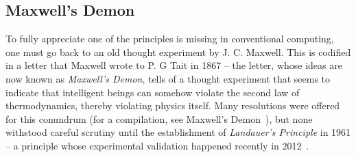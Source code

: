 \documentclass{article}
\begin{document}
\begin{comment}
\begin{quote}
  Ed Fredkin pursued the idea that information must be finite in
  density. One day, he announced that things must be even more simple
  than that. He said that he was going to assume that information
  itself is conserved. “You’re out of you mind, Ed.” I
  pronounced. “That’s completely ridiculous. Nothing could happen in
  such a world. There couldn’t even be logical gates. No decisions
  could ever be made.” But when Fredkin gets one of his ideas, he’s
  quite immune to objections like that; indeed, they fuel him with
  energy. Soon he went on to assume that information processing must
  also be reversible — and invented what’s now called the Fredkin
  gate. (Minsky 1999)

  In other terms, what is so good in logic that quantum physics should
  obey?  Can't we imagine that our conceptions about logic are wrong,
  so wrong that they are unable to cope with the quantum miracle?
  [\ldots] Instead of teaching logic to nature, it is more reasonable
  to learn from her. Instead of interpreting quantum into logic, we
  shall interpret logic into quantum (Girard 2007).
\end{quote}
\end{comment}

\subsection{Maxwell's Demon}

To fully appreciate one of the principles is missing in conventional
computing, one must go back to an old thought experiment by
J. C. Maxwell. This is codified in a letter that Maxwell wrote to P. G
Tait in 1867 -- the letter, whose ideas are now known as
\emph{Maxwell's Demon}, tells of a thought experiment that seems to
indicate that intelligent beings can somehow violate the second law of
thermodynamics, thereby violating physics itself. Many resolutions
were offered for this conundrum (for a compilation, see Maxwell's
Demon~\cite{leff1990}), but none withstood careful scrutiny until the
establishment of \emph{Landauer's Principle} in 1961 -- a principle
whose experimental validation happened recently in
2012~\cite{berut2012experimental}.
\end{document}
